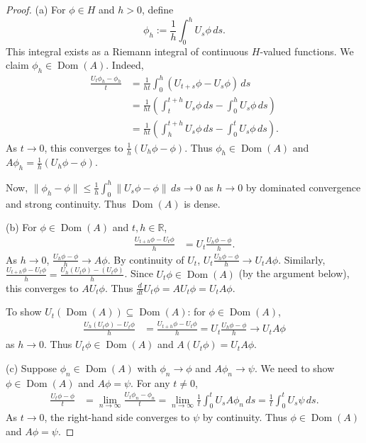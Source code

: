 \documentclass[11pt]{article}
\theoremstyle{definition}
\theoremstyle{remark}
\newcommand{\R}{\mathbb{R}}
\newcommand{\1}{\mathbbm{1}}
\DeclareMathOperator{\Dom}{Dom}
\begin{document}
\begin{proof}
(a) For $\phi\in H$ and $h>0$, define
\[
\phi_h:=\frac{1}{h}\int_0^h U_s\phi\,ds.
\]
This integral exists as a Riemann integral of continuous $H$-valued functions. We claim $\phi_h\in\Dom(A)$. Indeed,
\begin{align*}
\frac{U_t\phi_h-\phi_h}{t}&=\frac{1}{ht}\int_0^h(U_{t+s}\phi-U_s\phi)\,ds\\
&=\frac{1}{ht}\left(\int_t^{t+h}U_s\phi\,ds-\int_0^h U_s\phi\,ds\right)\\
&=\frac{1}{ht}\left(\int_h^{t+h}U_s\phi\,ds-\int_0^t U_s\phi\,ds\right).
\end{align*}
As $t\to 0$, this converges to $\frac{1}{h}(U_h\phi-\phi)$. Thus $\phi_h\in\Dom(A)$ and $A\phi_h=\frac{1}{h}(U_h\phi-\phi)$.

Now, $\|\phi_h-\phi\|\leq\frac{1}{h}\int_0^h\|U_s\phi-\phi\|\,ds\to 0$ as $h\to 0$ by dominated convergence and strong continuity. Thus $\Dom(A)$ is dense.

(b) For $\phi\in\Dom(A)$ and $t,h\in\R$,
\begin{align*}
\frac{U_{t+h}\phi-U_t\phi}{h}&=U_t\frac{U_h\phi-\phi}{h}.
\end{align*}
As $h\to 0$, $\frac{U_h\phi-\phi}{h}\to A\phi$. By continuity of $U_t$, $U_t\frac{U_h\phi-\phi}{h}\to U_tA\phi$. Similarly, $\frac{U_{t+h}\phi-U_t\phi}{h}=\frac{U_h(U_t\phi)-(U_t\phi)}{h}$. Since $U_t\phi\in\Dom(A)$ (by the argument below), this converges to $AU_t\phi$. Thus $\frac{d}{dt}U_t\phi=AU_t\phi=U_tA\phi$.

To show $U_t(\Dom(A))\subseteq\Dom(A)$: for $\phi\in\Dom(A)$,
\begin{align*}
\frac{U_h(U_t\phi)-U_t\phi}{h}&=\frac{U_{t+h}\phi-U_t\phi}{h}=U_t\frac{U_h\phi-\phi}{h}\to U_tA\phi
\end{align*}
as $h\to 0$. Thus $U_t\phi\in\Dom(A)$ and $A(U_t\phi)=U_tA\phi$.

(c) Suppose $\phi_n\in\Dom(A)$ with $\phi_n\to\phi$ and $A\phi_n\to\psi$. We need to show $\phi\in\Dom(A)$ and $A\phi=\psi$. For any $t\neq 0$,
\begin{align*}
\frac{U_t\phi-\phi}{t}&=\lim_{n\to\infty}\frac{U_t\phi_n-\phi_n}{t}=\lim_{n\to\infty}\frac{1}{t}\int_0^t U_sA\phi_n\,ds=\frac{1}{t}\int_0^t U_s\psi\,ds.
\end{align*}
As $t\to 0$, the right-hand side converges to $\psi$ by continuity. Thus $\phi\in\Dom(A)$ and $A\phi=\psi$.


\end{proof}
\end{document}
